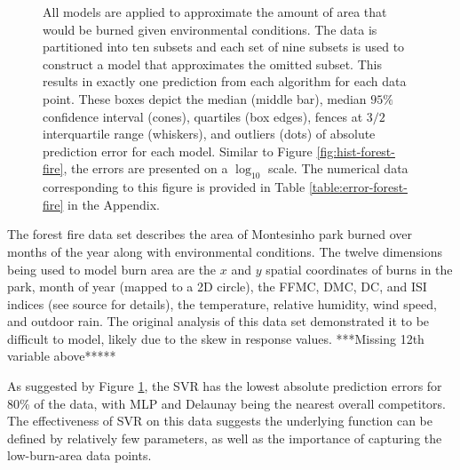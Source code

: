 \documentclass[smallextended,final]{svjour3}       %
\begin{document}
\begin{figure}
  \centering
  \caption{All models are applied to approximate the amount of area that
  would be burned given environmental conditions. The data is partitioned
  into ten subsets and each set of nine subsets is used to construct a
  model that approximates the omitted subset. This results in exactly one
  prediction from each algorithm for each data point. These boxes depict
  the median (middle bar), median $95\%$ confidence interval (cones),
  quartiles (box edges), fences at $3/2$ interquartile range (whiskers),
  and outliers (dots) of absolute prediction error for each model. Similar
  to Figure \ref{fig:hist-forest-fire}, the errors are presented on a
  $\log_{10}$ scale. The numerical data corresponding to this figure is
  provided in Table \ref{table:error-forest-fire} in the Appendix.}
\label{fig:error-forest-fire} \end{figure}


The forest fire data set \cite{cortez2007data} describes the area of
Montesinho park burned over months of the year along with environmental
conditions. The twelve dimensions being used to model burn area are the
$x$ and $y$ spatial coordinates of burns in the park, month of year (mapped
to a 2D circle), the FFMC, DMC, DC, and ISI indices (see source for details),
the temperature, relative humidity, wind speed, and outdoor rain. The
original analysis of this data set demonstrated it to be difficult to
model, likely due to the skew in response values.  ***Missing 12th
variable above*****

As suggested by Figure \ref{fig:error-forest-fire}, the SVR has the lowest
absolute prediction errors for 80\% of the data, with MLP and Delaunay
being the nearest overall competitors. The effectiveness of SVR on this
data suggests the underlying function can be defined by relatively few
parameters, as well as the importance of capturing the low-burn-area data
points. 
\end{document}
